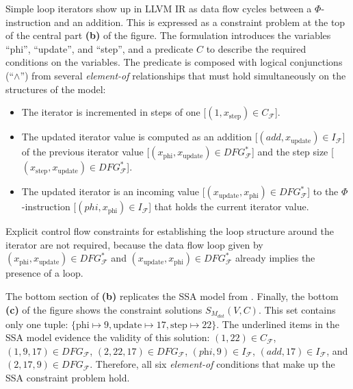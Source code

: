     Simple loop iterators show up in LLVM IR as data flow cycles between a
    $\Phi$-instruction and an addition.
    This is expressed as a constraint problem at the top of the central part
    {\bf(b)} of the figure.
    The formulation introduces the variables
    ``phi'', ``update'', and ``step'', and a predicate $C$ to describe the
    required conditions on the variables.
    The predicate is composed with logical conjunctions (``$\land$'') from
    several {\em element-of} relationships that must hold simultaneously on
    the structures of the model:
    \begin{itemize}
        \item The iterator is incremented in steps of one
              [$(1,x_\text{step})\in C_\mathcal{F}$].
        \item The updated iterator value is computed as an addition
              [$(add,x_\text{update})\in I_\mathcal{F}$] of the previous
              iterator value
              [$(x_\text{phi},x_\text{update})\in DFG_\mathcal{F}^*$] and the
              step size
              [$(x_\text{step},x_\text{update})\in DFG_\mathcal{F}^*$].
        \item The updated iterator is an incoming value
              [$(x_\text{update},x_\text{phi})\in DFG_\mathcal{F}^*$] to the
              $\Phi$-instruction [$(phi,x_\text{phi})\in I_\mathcal{F}$] that
              holds the current iterator value.
    \end{itemize}
    Explicit control flow constraints for establishing the loop structure around
    the iterator are not required, because the data flow loop given by
    $(x_\text{phi},x_\text{update})\in DFG_\mathcal{F}^*$ and
    $(x_\text{update},x_\text{phi})\in DFG_\mathcal{F}^*$ already implies
    the presence of a loop.

    The bottom section of  {\bf(b)} replicates the
    SSA model from .
    Finally, the bottom {\bf(c)} of the figure shows the constraint solutions
    $S_{M_{dot}}(V,C)$.
    This set contains only one tuple:
    $\{\text{phi}\mapsto9,\text{update}\mapsto17,\text{step}\mapsto22\}$.
    The underlined items in the SSA model evidence the validity of this
    solution:
    $(1,22)\in C_\mathcal F$, $(1,9,17)\in DFG_\mathcal F$,
    $(2,22,17)\in DFG_\mathcal F$, \mbox{$(\textit{phi},9)\in I_\mathcal F$},
    $(\textit{add},17)\in I_\mathcal F$, and $(2,17,9)\in DFG_\mathcal F$.
    Therefore, all six {\it element-of} conditions that make up the SSA
    constraint problem hold.

